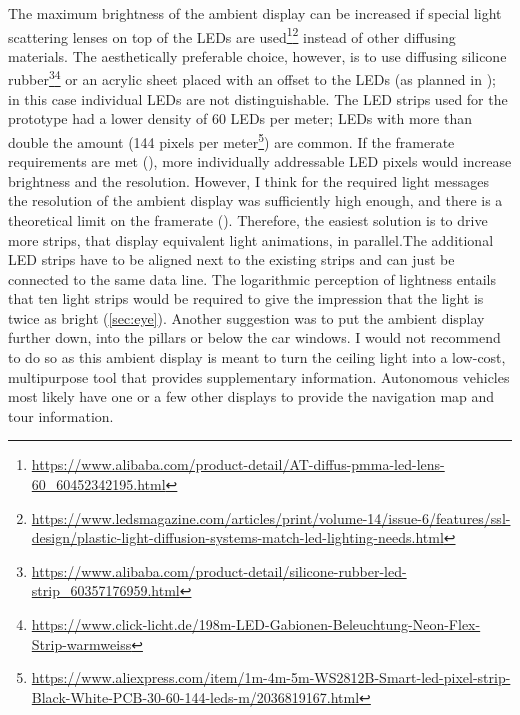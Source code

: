 The maximum brightness of the ambient display can be increased if special light scattering lenses on top of the LEDs are used\footnote{\url{https://www.alibaba.com/product-detail/AT-diffus-pmma-led-lens-60_60452342195.html}}\fnsep\footnote{\url{https://www.ledsmagazine.com/articles/print/volume-14/issue-6/features/ssl-design/plastic-light-diffusion-systems-match-led-lighting-needs.html}} instead of other diffusing materials. The aesthetically preferable choice, however, is to use diffusing silicone rubber\footnote{\url{https://www.alibaba.com/product-detail/silicone-rubber-led-strip_60357176959.html}}\fnsep\footnote{\url{https://www.click-licht.de/198m-LED-Gabionen-Beleuchtung-Neon-Flex-Strip-warmweiss}} or an acrylic sheet placed with an offset to the LEDs (as planned in \emph{}); in this case individual LEDs are not distinguishable. The LED strips used for the prototype had a lower density of 60 LEDs per meter; LEDs with more than double the amount (144 pixels per meter\footnote{\url{https://www.aliexpress.com/item/1m-4m-5m-WS2812B-Smart-led-pixel-strip-Black-White-PCB-30-60-144-leds-m/2036819167.html}}) are common. If the framerate requirements are met (\emph{}), more individually addressable LED pixels would increase brightness and the resolution. However, I think for the required light messages the resolution of the ambient display was sufficiently high enough, and there is a theoretical limit on the framerate (\emph{}). Therefore, the easiest solution is to drive more strips, that display equivalent light animations, in parallel.The additional LED strips have to be aligned next to the existing strips and can just be connected to the same data line. The logarithmic perception of lightness entails that ten light strips would be required to give the impression that the light is twice as bright (\ref{sec:eye}). 
Another suggestion was to put the ambient display further down, into the pillars or below the car windows. I would not recommend to do so as this ambient display is meant to turn the ceiling light into a low-cost, multipurpose tool that provides supplementary information. Autonomous vehicles most likely have one or a few other displays to provide the navigation map and tour information. 


